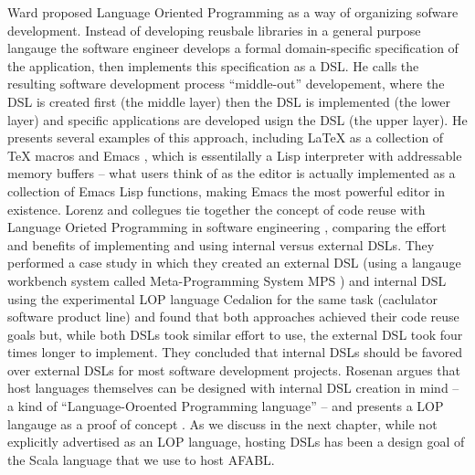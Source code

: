 Ward \cite{ward1994language} proposed Language Oriented Programming as a way of organizing sofware development. Instead of developing reusbale libraries in a general purpose langauge the software engineer develops a formal domain-specific specification of the application, then implements this specification as a DSL. He calls the resulting software development process ``middle-out'' developement, where the DSL is created first (the middle layer) then the DSL is implemented (the lower layer) and specific applications are developed usign the DSL (the upper layer). He presents several examples of this approach, including \LaTeX \cite{lamport1986document} as a collection of \TeX \cite{knuth1984texbook} macros and Emacs \cite{stallman2014emacs}, which is essentilally a Lisp interpreter with addressable memory buffers -- what users think of as the editor is actually implemented as a collection of Emacs Lisp functions, making Emacs the most powerful editor in existence.
Lorenz and collegues tie together the concept of code reuse with Language Orieted Programming in software engineering \cite{lorenz2011a-code}, comparing the effort and benefits of implementing and using internal versus external DSLs. They performed a case study in which they created an external DSL (using a langauge workbench system called Meta-Programming System MPS \cite{dmitriev2004language}) and internal DSL using the experimental LOP language Cedalion \cite{rosenan2010designing} for the same task (caclulator software product line) and found that both approaches achieved their code reuse goals but, while both DSLs took similar effort to use, the external DSL took four times longer to implement. They concluded that internal DSLs should be favored over external DSLs for most software development projects. Rosenan argues that host languages themselves can be designed with internal DSL creation in mind -- a kind of ``Language-Oroented Programming language'' -- and presents a LOP langauge as a proof of concept \cite{rosenan2010designing}. As we discuss in the next chapter, while not explicitly advertised as an LOP language, hosting DSLs has been a design goal of the Scala language that we use to host AFABL.










